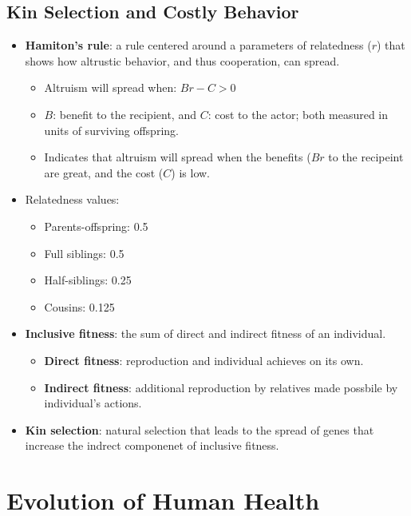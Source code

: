 \documentclass[12pt,a4paper]{article}
\begin{document}
\subsection{Kin Selection and Costly Behavior}
\begin{itemize}
    \item \textbf{Hamiton's rule}: a rule centered around a parameters of relatedness (\(r\)) that shows how altrustic behavior, and thus cooperation, can spread.
        \begin{itemize}
            \item Altruism will spread when: \(Br - C > 0\)
            \item \(B\): benefit to the recipient, and \(C\): cost to the actor; both measured in units of surviving offspring.
            \item Indicates that altruism will spread when the benefits (\(Br\) to the recipeint are great, and the cost (\(C\)) is low.
        \end{itemize}
    \item Relatedness values:
        \begin{itemize}
            \item Parents-offspring: 0.5
            \item Full siblings: 0.5
            \item Half-siblings: 0.25
            \item Cousins: 0.125
        \end{itemize}
    \item \textbf{Inclusive fitness}: the sum of direct and indirect fitness of an individual.
        \begin{itemize}
            \item \textbf{Direct fitness}: reproduction and individual achieves on its own. 
            \item \textbf{Indirect fitness}: additional reproduction by relatives made possbile by individual's actions.
        \end{itemize}
    \item \textbf{Kin selection}: natural selection that leads to the spread of genes that increase the indrect componenet of inclusive fitness.
\end{itemize}

\clearpage
\section{Evolution of Human Health}
\end{document}
